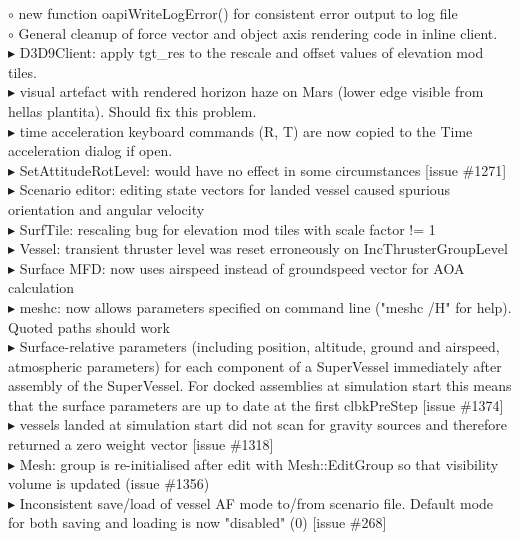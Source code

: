 \documentclass[Orbiter User Manual.tex]{subfiles}
\begin{document}
$\circ$ new function oapiWriteLogError() for consistent error output to log file\\
$\circ$ General cleanup of force vector and object axis rendering code in inline client.\\
$\blacktriangleright$ D3D9Client: apply tgt\_res to the rescale and offset values of elevation mod tiles.\\
$\blacktriangleright$ visual artefact with rendered horizon haze on Mars (lower edge visible from hellas plantita). Should fix this problem.\\
$\blacktriangleright$ time acceleration keyboard commands (R, T) are now copied to the Time acceleration dialog if open.\\
$\blacktriangleright$ SetAttitudeRotLevel: would have no effect in some circumstances [issue \#1271]\\
$\blacktriangleright$ Scenario editor: editing state vectors for landed vessel caused spurious orientation and angular velocity\\
$\blacktriangleright$ SurfTile: rescaling bug for elevation mod tiles with scale factor != 1\\
$\blacktriangleright$ Vessel: transient thruster level was reset erroneously on IncThrusterGroupLevel\\
$\blacktriangleright$ Surface MFD: now uses airspeed instead of groundspeed vector for AOA calculation\\
$\blacktriangleright$ meshc: now allows parameters specified on command line ("meshc /H" for help). Quoted paths should work\\
$\blacktriangleright$ Surface-relative parameters (including position, altitude, ground and airspeed, atmospheric parameters) for each component of a SuperVessel immediately after assembly of the SuperVessel. For docked assemblies at simulation start this means that the surface parameters are up to date at the first clbkPreStep [issue \#1374]\\
$\blacktriangleright$ vessels landed at simulation start did not scan for gravity sources and therefore returned a zero weight vector [issue \#1318]\\
$\blacktriangleright$ Mesh: group is re-initialised after edit with Mesh::EditGroup so that visibility volume is updated (issue \#1356)\\
$\blacktriangleright$ Inconsistent save/load of vessel AF mode to/from scenario file. Default mode for both saving and loading is now "disabled" (0) [issue \#268]\\
\end{document}
